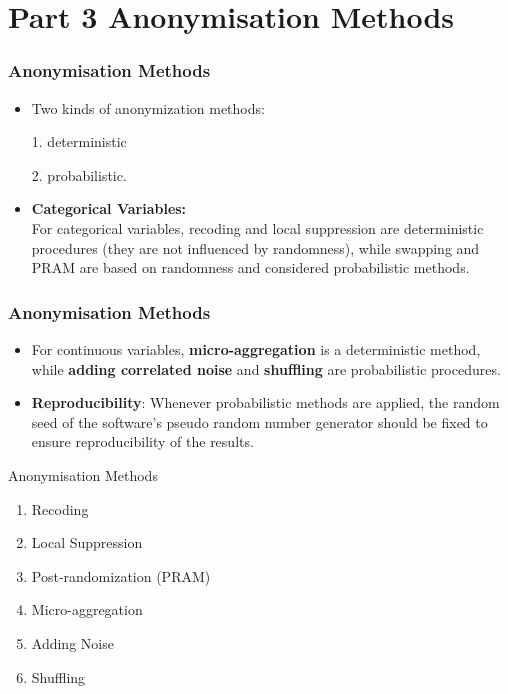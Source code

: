 \documentclass{beamer}
\begin{document}
\section*{Part 3 Anonymisation Methods}	
	

 
 

\begin{frame}

\frametitle{ Anonymisation Methods}
\begin{itemize}
\item Two kinds of anonymization methods:
\item[1.] deterministic 
\item[2.] probabilistic. 
\bigskip
\item \textbf{Categorical Variables:}\\ For categorical variables, recoding and local suppression are deterministic
procedures (they are not influenced by randomness), while swapping and PRAM are based on randomness and considered probabilistic
methods. 
\end{itemize}
\end{frame}
\begin{frame}
	
	\frametitle{ Anonymisation Methods}
	\begin{itemize}
\item 
For continuous variables, \textbf{micro-aggregation} is a deterministic method,
while\textbf{ adding correlated noise}  and \textbf{shuffling}
are probabilistic procedures. 
\bigskip
\item \textbf{Reproducibility}: Whenever probabilistic methods are applied, the random seed of the software’s pseudo random number generator should be fixed to
ensure reproducibility of the results.
\end{itemize}
\end{frame}
\begin{frame}
	\Large
Anonymisation Methods
\begin{enumerate}	
	\item Recoding
	\item Local Suppression
	\item Post-randomization (PRAM)
	\item Micro-aggregation
	\item Adding Noise
	\item Shuffling
\end{enumerate}
\end{frame}
\end{document}
